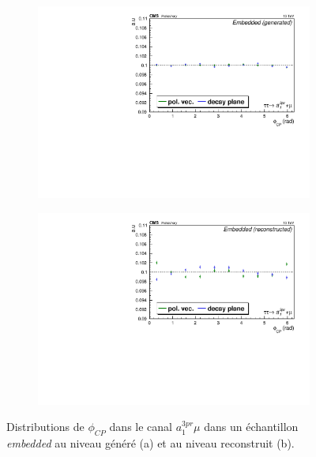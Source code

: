 \begin{figure}[!ht]
  \begin{subfigure}[b]{0.5\linewidth}
    \centering
    \includegraphics[width=\linewidth]{Chapitre6/Images/A1MU/gena1muemb.pdf} 
    \caption{} 
    \vspace{0.5ex}
  \end{subfigure}%
  \begin{subfigure}[b]{0.5\linewidth}
    \centering
    \includegraphics[width=\linewidth]{Chapitre6/Images/A1MU/recoa1muemb.pdf} 
    \caption{} 
    \vspace{0.5ex}
  \end{subfigure}%
  \caption{Distributions de $\phi_{CP}$ dans le canal $a_1^{3pr}\mu$ dans un échantillon \textit{embedded} au niveau généré (a) et au niveau reconstruit (b).}
  \label{embflatness}
\end{figure}